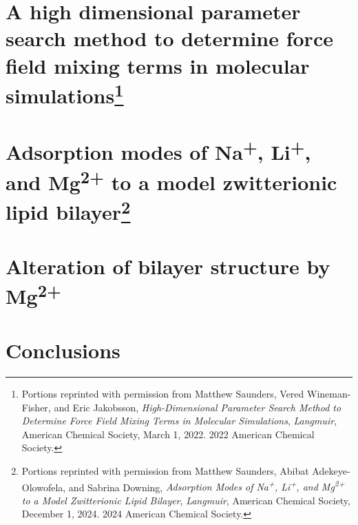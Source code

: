 \documentclass[12pt,openany,final]{book}
\newcommand{\na}{Na\textsuperscript{+}}
\newcommand{\li}{Li\textsuperscript{+}}
\newcommand{\mg}{Mg\textsuperscript{2+}}
\begin{document}
\chapter[A high dimensional parameter search method to...]{A high dimensional parameter search method to determine force field mixing terms in molecular simulations\footnote{
Portions reprinted with permission from Matthew Saunders, Vered Wineman-Fisher, and Eric Jakobsson, \textit{High-Dimensional Parameter Search Method to Determine Force Field Mixing Terms in Molecular Simulations}, 
\textit{Langmuir}, American Chemical Society, March 1, 2022. 
\textcopyright{} 2022 American Chemical Society.
}}
\graphicspath{{CH2/figures/}}

\chapter[Adsorption modes of \na{}, \li{}, and \mg{} to a model zwitterionic lipid bilayer]{Adsorption modes of \na{}, \li{}, and \mg{} to a model zwitterionic lipid bilayer\footnote{
    Portions reprinted with permission from Matthew Saunders, Abibat Adekeye-Olowofela, and Sabrina Downing, \textit{Adsorption Modes of Na\textsuperscript{+}, Li\textsuperscript{+}, and Mg\textsuperscript{2+} to a Model Zwitterionic Lipid Bilayer}, 
\textit{Langmuir}, American Chemical Society, December 1, 2024. 
\textcopyright{} 2024 American Chemical Society.
}}
\graphicspath{{CH3/figures/}}

\chapter[Alteration of bilayer structure by \mg{}]{Alteration of bilayer structure by \mg{}}
\graphicspath{{CH4/figures/}}

\chapter{Conclusions}
\graphicspath{{CH5/figures/}}


\end{document}
